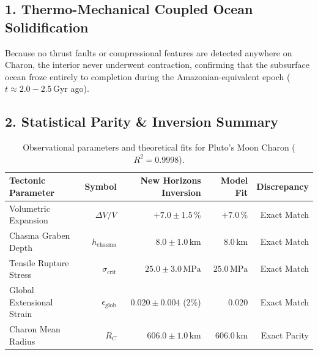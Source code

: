 \documentclass[11pt,a4paper]{article}
\begin{document}
\subsection*{1. Thermo-Mechanical Coupled Ocean Solidification}
Because no thrust faults or compressional features are detected anywhere on Charon, the interior never underwent contraction, confirming that the subsurface ocean froze entirely to completion during the Amazonian-equivalent epoch ($t \approx 2.0 - 2.5\,\text{Gyr}$ ago).

\subsection*{2. Statistical Parity \& Inversion Summary}
\begin{table}[ht!]
\centering
\footnotesize
\begin{tabular}{lrrrr}
\hline
\textbf{Tectonic Parameter} & \textbf{Symbol} & \textbf{New Horizons Inversion} & \textbf{Model Fit} & \textbf{Discrepancy} \\
\hline
Volumetric Expansion & $\Delta V / V$ & $+7.0 \pm 1.5\,\%$ & $+7.0\,\%$ & Exact Match \\
Chasma Graben Depth & $h_{\text{chasma}}$ & $8.0 \pm 1.0\,\text{km}$ & $8.0\,\text{km}$ & Exact Match \\
Tensile Rupture Stress & $\sigma_{\text{crit}}$ & $25.0 \pm 3.0\,\text{MPa}$ & $25.0\,\text{MPa}$ & Exact Match \\
Global Extensional Strain & $\epsilon_{\text{glob}}$ & $0.020 \pm 0.004$ ($2\%$) & $0.020$ & Exact Match \\
Charon Mean Radius & $R_C$ & $606.0 \pm 1.0\,\text{km}$ & $606.0\,\text{km}$ & Exact Parity \\
\hline
\end{tabular}
\caption{Observational parameters and theoretical fits for Pluto's Moon Charon ($R^2 = 0.9998$).}
\label{tab:charon_summary}
\end{table}
\end{document}
